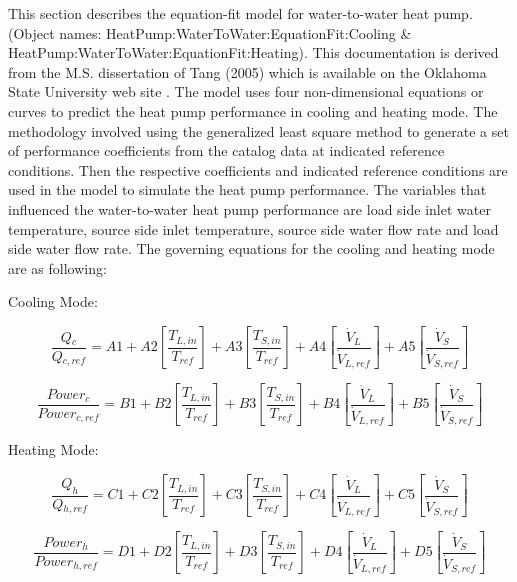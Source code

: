 This section describes the equation-fit model for water-to-water heat pump. (Object names: HeatPump:WaterToWater:EquationFit:Cooling \& HeatPump:WaterToWater:EquationFit:Heating). This documentation is derived from the M.S. dissertation of Tang (2005) which is available on the Oklahoma State University web site . The model uses four non-dimensional equations or curves to predict the heat pump performance in cooling and heating mode. The methodology involved using the generalized least square method to generate a set of performance coefficients from the catalog data at indicated reference conditions. Then the respective coefficients and indicated reference conditions are used in the model to simulate the heat pump performance. The variables that influenced the water-to-water heat pump performance are load side inlet water temperature, source side inlet temperature, source side water flow rate and load side water flow rate. The governing equations for the cooling and heating mode are as following:

Cooling Mode:

\begin{equation}
\frac{{Q{}_c}}{{Q{}_{c,ref}}} = A1 + A2\left[ {\frac{{T{}_{L,in}}}{{T{}_{ref}}}} \right] + A3\left[ {\frac{{T{}_{S,in}}}{{T{}_{ref}}}} \right] + A4\left[ {\frac{{{{\dot V}_L}}}{{{{\dot V}_{L,ref}}}}} \right] + A5\left[ {\frac{{{{\dot V}_S}}}{{{{\dot V}_{S,ref}}}}} \right]
\end{equation}

\begin{equation}
\frac{{Power{}_c}}{{Power{}_{c,ref}}} = B1 + B2\left[ {\frac{{T{}_{L,in}}}{{T{}_{ref}}}} \right] + B3\left[ {\frac{{T{}_{S,in}}}{{T{}_{ref}}}} \right] + B4\left[ {\frac{{{{\dot V}_L}}}{{{{\dot V}_{L,ref}}}}} \right] + B5\left[ {\frac{{{{\dot V}_S}}}{{{{\dot V}_{S,ref}}}}} \right]
\end{equation}

Heating Mode:

\begin{equation}
\frac{{{Q_h}}}{{Q{}_{h,ref}}} = C1 + C2\left[ {\frac{{T{}_{L,in}}}{{T{}_{ref}}}} \right] + C3\left[ {\frac{{T{}_{S,in}}}{{T{}_{ref}}}} \right] + C4\left[ {\frac{{{{\dot V}_L}}}{{{{\dot V}_{L,ref}}}}} \right] + C5\left[ {\frac{{{{\dot V}_S}}}{{{{\dot V}_{S,ref}}}}} \right]
\end{equation}

\begin{equation}
\frac{{Power{_h}}}{{Power{}_{h,ref}}} = D1 + D2\left[ {\frac{{T{}_{L,in}}}{{T{}_{ref}}}} \right] + D3\left[ {\frac{{T{}_{S,in}}}{{T{}_{ref}}}} \right] + D4\left[ {\frac{{{{\dot V}_L}}}{{{{\dot V}_{L,ref}}}}} \right] + D5\left[ {\frac{{{{\dot V}_S}}}{{{{\dot V}_{S,ref}}}}} \right]
\end{equation}

